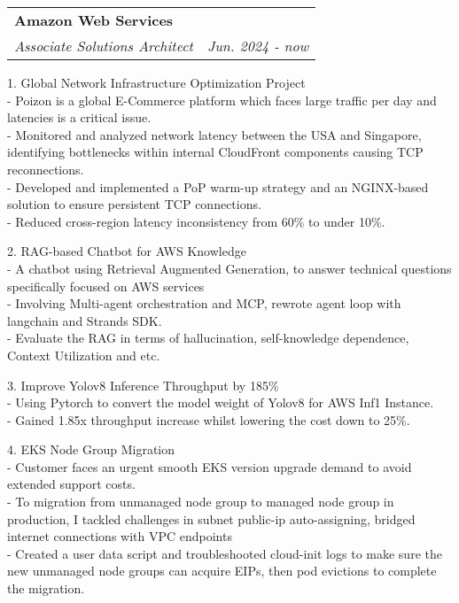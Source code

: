 \documentclass[letterpaper,11pt]{article}
\makeatletter
\renewenvironment{itemize}{
  \begin{list}{}{
    \setlength{\leftmargin}{0.6em}
    \setlength{\textwidth}{7.5in}
    \setlength{\topmargin}{-0.6in}
    \setlength{\textheight}{19.5in}
  }
}{
  \end{list}
}
\newcommand{\resitem}[1]{\item #1 \vspace{-2pt}}
\newcommand{\resheading}[1]{{\large \parashade[.9]{sharpcorners}{\textbf{#1 \vphantom{p\^{E}}}}}}
\newcommand{\ressubheading}[4]{
\begin{tabular*}{6.5in}{l@{\extracolsep{\fill}}r}
		\textbf{#1} & #2 \\
		\textit{#3} & \textit{#4} \\
\end{tabular*}\vspace{-8.5pt}} %
\makeatother
\begin{document}
\resheading{Work Experiences}
\begin{itemize}
\item
	\ressubheading{Amazon Web Services}{}{Associate Solutions Architect}{Jun. 2024 - now}
	\begin{itemize}
		\resitem{
1. Global Network Infrastructure Optimization Project\\
- Poizon is a global E-Commerce platform which faces large traffic per day and latencies is a critical issue.\\
- Monitored and analyzed network latency between the USA and Singapore, identifying bottlenecks within internal CloudFront components causing TCP reconnections.\\
- Developed and implemented a PoP warm-up strategy and an NGINX-based solution to ensure persistent TCP connections.\\
- Reduced cross-region latency inconsistency from 60\% to under 10\%.
		}
		\resitem{
2. RAG-based Chatbot for AWS Knowledge\\
- A chatbot using Retrieval Augmented Generation, to answer technical questions specifically focused on AWS services \\
- Involving Multi-agent orchestration and MCP, rewrote agent loop with langchain and Strands SDK.\\
- Evaluate the RAG in terms of hallucination, self-knowledge dependence, Context Utilization and etc. 
		}
		\resitem{
3. Improve Yolov8 Inference Throughput by 185\% \\
- Using Pytorch to convert the model weight of Yolov8 for AWS Inf1 Instance. \\
- Gained 1.85x throughput increase whilst lowering the cost down to 25\%.  
                }
		\resitem{
4. EKS Node Group Migration\\
- Customer faces an urgent smooth EKS version upgrade demand to avoid extended support costs.\\
- To migration from unmanaged node group to managed node group in production, I tackled challenges in subnet public-ip auto-assigning, bridged internet connections with VPC endpoints\\
- Created a user data script and troubleshooted cloud-init logs to make sure the new unmanaged node groups can acquire EIPs, then pod evictions to complete the migration.\\
		}
	\end{itemize}


\end{itemize}
\end{document}
